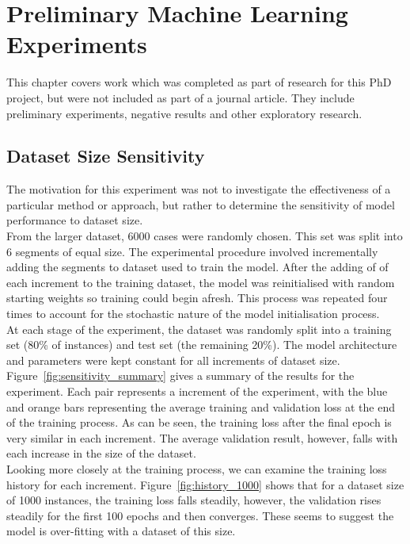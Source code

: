 \chapter{Preliminary Machine Learning Experiments}
\label{cha:preliminary}

This chapter covers work which was completed as part of research for this PhD project, but were not included as part of a journal article. They include preliminary experiments, negative results and other exploratory research. 

\section{Dataset Size Sensitivity}

\noindent The motivation for this experiment was not to investigate the effectiveness of a particular method or approach, but rather to determine the sensitivity of model performance to dataset size. \\

\noindent From the larger dataset, 6000 cases  were randomly chosen. This set was split into 6 segments of equal size. The experimental procedure involved incrementally adding the segments to dataset used to train the model. After the adding of of each increment to the training dataset, the model was reinitialised with random starting weights so training could begin afresh. This process was repeated four times to account for the stochastic nature of the model initialisation process. \\

\noindent At each stage of the experiment, the dataset was randomly split into a training set (80\% of instances) and test set (the remaining 20\%). The model architecture and parameters were kept constant for all increments of dataset size. 
\\

\noindent 
Figure~\ref{fig:sensitivity_summary} gives a summary of the results for the experiment. Each pair represents a increment of the experiment, with the blue and orange bars representing the average training and validation loss at the end of the training process. As can be seen, the training loss after the final epoch is very similar in each increment. The average validation result, however, falls with each increase in the size of the dataset. \\

\noindent Looking more closely at the training process, we can examine the training loss history for each increment. Figure~\ref{fig:history_1000} shows that for a dataset size of 1000 instances, the training loss falls steadily, however, the validation rises steadily for the first 100 epochs and then converges. These seems to suggest the model is over-fitting with a dataset of this size. \\

